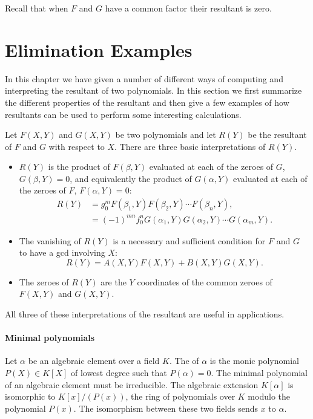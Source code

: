 \noindent
Recall that when $F$ and $G$ have a common factor their resultant is zero.

\section{Elimination Examples}
\label{Result:Examp:Sec}

In this chapter we have given a number of different ways of computing
and interpreting the resultant of two polynomials.  In this section we
first summarize the different properties of the resultant and then
give a few examples of how resultants can be used to perform some
interesting calculations.

Let $F(X, Y)$ and $G(X,Y)$ be two polynomials and let $R(Y)$ be the
resultant of $F$ and $G$ with respect to $X$.  There are three basic
interpretations of $R(Y)$.
\begin{itemize}
\item $R(Y)$ is the product of $F(\beta, Y)$ evaluated at each of the
zeroes of $G$, $G(\beta, Y) = 0$, and equivalently the product of
$G(\alpha, Y)$ evaluated at each of the zeroes of $F$, $F(\alpha, Y) =
0$:
\[
\begin{aligned}
R(Y) & = g_0^m F(\beta_1, Y) F(\beta_2, Y) \cdots F(\beta_n, Y), \\
  & = (-1)^{mn} f_0^n G(\alpha_1, Y) G(\alpha_2, Y) \cdots G(\alpha_m, Y).
\end{aligned}
\]
\item The vanishing of $R(Y)$ is a necessary and sufficient condition
for $F$ and $G$ to have a {\sc gcd} involving $X$:
\[
R(Y) = A(X, Y) F(X, Y) + B(X, Y) G(X, Y).
\]
\item The zeroes of $R(Y)$ are the $Y$ coordinates of the common zeroes
of $F(X, Y)$ and $G(X, Y)$.
\end{itemize}
All three of these interpretations of the resultant are useful in
applications. 

\paragraph{Minimal polynomials}

 Let $\alpha$ be an algebraic element
over a field $K$.  The  of $\alpha$ is the
monic polynomial $P(X) \in K[X]$ of lowest degree such that $P(\alpha)
= 0$.  The minimal polynomial of an algebraic element must be
irreducible.  The algebraic extension $K[\alpha]$ is isomorphic to
$K[x]/(P(x))$, the ring of polynomials over $K$ modulo the polynomial
$P(x)$. The isomorphism between these two fields sends $x$ to
$\alpha$.

